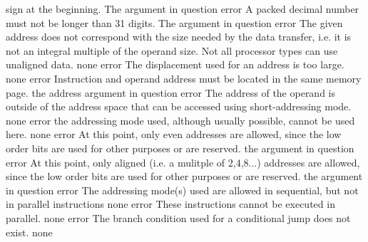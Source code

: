 \documentclass[12pt,twoside]{report}
\begin{document}
\begin{description}
{                sign at the beginning.}
               {The argument in question}
               {error}
               {A packed decimal number must not be longer than 31 digits.}
               {The argument in question}
               {error}
               {The given address does not correspond with the size needed
                by the data transfer, i.e. it is not an integral multiple of
                the operand size. Not all processor types can use unaligned
                data.}
               {none}
               {error}
               {The displacement used for an address is too large.}
               {none}
               {error}
               {Instruction and operand address must be located in the
                same memory page.}
               {the address argument in question}
               {error}
               {The address of the operand is outside of the address space
                that can be accessed using short-addressing mode.}
               {none}
               {error}
               {the addressing mode used, although usually possible,
                cannot be used here.}
               {none}
               {error}
               {At this point, only even addresses are allowed, since the
                low order bits are used for other purposes or are reserved.}
               {the argument in question}
               {error}
               {At this point, only aligned (i.e. a mulitple of 2,4,8...) addresses
                are allowed, since the low order bits are used for other purposes
                or are reserved.}
               {the argument in question}
               {error}
               {The addressing mode(s) used are allowed in sequential,
                but not in parallel instructions}
               {none}
               {error}
               {These instructions cannot be executed in parallel.}
               {none}
               {error}
               {The branch condition used for a conditional jump does not
                exist.}
               {none}

\end{description}
\end{document}
